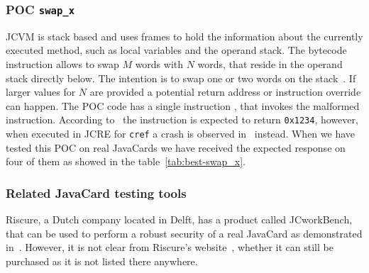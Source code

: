\documentclass{../llncs/llncs}
\begin{document}

\subsubsection{POC \texttt{swap_x}}
JCVM is stack based and uses frames to hold the information about the currently executed method, such as local variables and the operand stack. The bytecode instruction \swapx allows to swap $M$ words with $N$ words, that reside in the operand stack directly below. The intention is to swap one or two words on the stack~\cite{jcspecs31download}. If larger values for $N$ are provided a potential return address or instruction override can happen.
The POC code has a single instruction \triggerswapx, that invokes the malformed \swapx instruction. According to~\cite{se:oracle:part1} the instruction is expected to return \texttt{0x1234}, however, when executed in JCRE for \texttt{cref} a crash is observed in~\cite{se:oracle:part1} instead. When we have tested this POC on real JavaCards we have received the expected response
on four of them as showed in the table~\ref{tab:best-swap_x}.


\subsubsection{Related JavaCard testing tools}
Riscure, a Dutch company located in Delft, has a product called JCworkBench, that can be used to perform a robust security of a real JavaCard as demonstrated in~\cite{jcworkbench,riscurejcworkbenchpdf}. However, it is not clear from Riscure's website~\cite{riscureweb}, whether it can still be purchased as it is not listed there anywhere.\footnotemark
\end{document}
